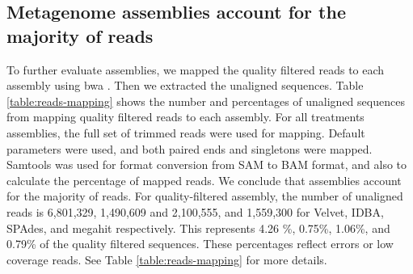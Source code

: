 



\subsection*{Metagenome assemblies account for the majority of reads}
To further evaluate assemblies, we mapped the quality filtered reads to each assembly using bwa \cite{bwa-mem}.  Then we extracted the unaligned sequences. Table \ref{table:reads-mapping} shows the number and percentages of unaligned sequences from mapping quality filtered reads to each assembly. For all treatments assemblies, the full set of trimmed reads were used for mapping. Default parameters were used, and both paired ends and singletons were mapped.  Samtools  \cite{samtools} was used for format conversion from SAM to BAM format, and also to calculate the percentage of mapped reads.  We conclude that assemblies account for the majority of reads.  
For quality-filtered assembly, the number of unaligned reads is 6,801,329, 1,490,609 and 2,100,555, and 1,559,300 for Velvet, IDBA, SPAdes, and megahit respectively. This represents 4.26 \%, 0.75\%, 1.06\%, and 0.79\% of the quality filtered sequences. These percentages reflect errors or low coverage reads. See Table \ref{table:reads-mapping}  for more details. 

